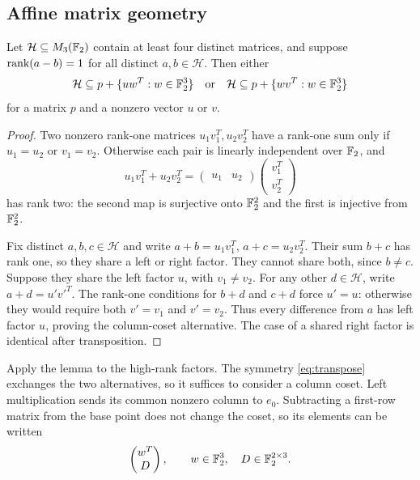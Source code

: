 \subsection{Affine matrix geometry}
\begin{lemma}\label{lem:coset}
Let $\mathcal H\subseteq M_3(\mathbb F_2)$ contain at least four distinct matrices,
and suppose $\operatorname{rank}(a-b)=1$ for all distinct $a,b\in\mathcal H$.
Then either
\[
 \mathcal H\subseteq p+\{uw^T:w\in\mathbb F_2^3\}
 \quad\text{or}\quad
 \mathcal H\subseteq p+\{wv^T:w\in\mathbb F_2^3\}
\]
for a matrix $p$ and a nonzero vector $u$ or $v$.
\end{lemma}
\begin{proof}
Two nonzero rank-one matrices $u_1v_1^T,u_2v_2^T$ have a rank-one
sum only if $u_1=u_2$ or $v_1=v_2$. Otherwise each pair is linearly
independent over $\mathbb F_2$, and
\[
 u_1v_1^T+u_2v_2^T
  =\begin{pmatrix}u_1&u_2\end{pmatrix}
    \begin{pmatrix}v_1^T\\v_2^T\end{pmatrix}
\]
has rank two: the second map is surjective onto $\mathbb F_2^2$ and the first
is injective from $\mathbb F_2^2$.

Fix distinct $a,b,c\in\mathcal H$ and write
$a+b=u_1v_1^T$, $a+c=u_2v_2^T$. Their sum $b+c$ has rank one,
so they share a left or right factor. They cannot share both, since
$b\ne c$. Suppose they share the left factor $u$, with $v_1\ne v_2$.
For any other $d\in\mathcal H$, write $a+d=u'v'^T$. The rank-one
conditions for $b+d$ and $c+d$ force $u'=u$: otherwise they would
require both $v'=v_1$ and $v'=v_2$. Thus every difference from $a$
has left factor $u$, proving the column-coset alternative. The case of
a shared right factor is identical after transposition.
\end{proof}

Apply the lemma to the high-rank factors. The symmetry
\eqref{eq:transpose} exchanges the two alternatives, so it suffices to
consider a column coset. Left multiplication sends its common nonzero
column to $e_0$. Subtracting a first-row matrix from the base point
does not change the coset, so its elements can be written
\begin{equation}\label{eq:coset-block}
 \begin{pmatrix}w^T\\D\end{pmatrix},
 \qquad w\in\mathbb F_2^3,\quad D\in\mathbb F_2^{2\times3}.
\end{equation}

